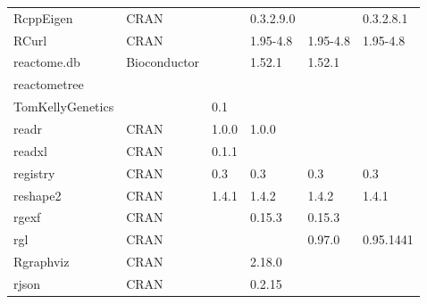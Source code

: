 \begin{longtable}{llllll}
\rowcolor{black!5}
RcppEigen                     & \acrshort{CRAN}                      &             & 0.3.2.9.0   &                & 0.3.2.8.1          \\
\rowcolor{black!10}
RCurl                         & \acrshort{CRAN}                      &             & 1.95-4.8    & 1.95-4.8       & 1.95-4.8          \\
\rowcolor{black!5}
reactome.db                   & Bioconductor              &             & 1.52.1      & 1.52.1         &                    \\
\rowcolor{black!10}
reactometree                  & \begin{tabular}[c]{@{}l@{}}GitHub \\ TomKellyGenetics \end{tabular}  &             & 0.1         &                &                   \\
\rowcolor{black!5}
readr                         & \acrshort{CRAN}                      & 1.0.0       & 1.0.0       &                &                    \\
\rowcolor{black!10}
readxl                        & \acrshort{CRAN}                      & 0.1.1       &             &                &                   \\
\rowcolor{black!5}
registry                      & \acrshort{CRAN}                      & 0.3         & 0.3         & 0.3            & 0.3                \\
\rowcolor{black!10}
reshape2                      & \acrshort{CRAN}                      & 1.4.1       & 1.4.2       & 1.4.2          & 1.4.1             \\
\rowcolor{black!5}
rgexf                         & \acrshort{CRAN}                      &             & 0.15.3      & 0.15.3         &                    \\
\rowcolor{black!10}
rgl                           & \acrshort{CRAN}                      &             &             & 0.97.0         & 0.95.1441         \\
\rowcolor{black!5}
Rgraphviz                     & \acrshort{CRAN}                      &             & 2.18.0      &                &                    \\
\rowcolor{black!10}
rjson                         & \acrshort{CRAN}                      &             & 0.2.15      &                &                   \\

\end{longtable}
